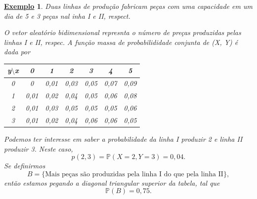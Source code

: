 \documentclass{article}
\newtheorem{example}{\underline{Exemplo}}
\begin{document}
\begin{example}
  Duas linhas de produção fabricam peças com uma capacidade em um dia de 5 e 3 peças nal inha I e II, respect.

  O vetor aleatório bidimensional represnta o número de preças produzidas pelas linhas I e II, respec. A função massa de probabilididade conjunta
  de (X, Y) é dada por
  \begin{center}
    \begin{table}[h!]
      \centering
      \begin{tabular}{| c | c | c | c | c | c | c |}
        \hline
         y\(\setminus\)x & 0 & 1 & 2 & 3 & 4 & 5\\
        \hline
        0 & 0 & 0,01 & 0,03 & 0,05 & 0,07 & 0,09\\
        1 & 0,01 & 0,02 & 0,04 & 0,05 & 0,06 & 0,08\\
        2 & 0,01 & 0,03 & 0,05 & 0,05 & 0,05 & 0,06\\
        3 & 0,01 & 0,02 & 0,04 & 0,06 & 0,06 & 0,05\\
        \hline
      \end{tabular}
    \end{table}
  \end{center}
  Podemos ter interesse em saber a probabilidade da linha I produzir 2 e linha II produzir 3. Neste caso, 
  \[
    p(2, 3) = \mathbb{P}(X=2, Y = 3) = 0,04.
  \]
  Se definirmos 
  \[
    B = \{\text{Mais peças são produzidas pela linha I do que pela linha II}\},
  \]
  então estamos pegando a diagonal triangular superior da tabela, tal que 
  \[
    \mathbb{P}(B) = 0,75.
  \]
\end{example}
\end{document}
